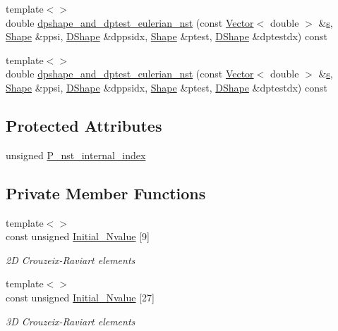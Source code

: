 \begin{DoxyCompactItemize}
\item 
{\footnotesize template$<$$>$ }\\double \hyperlink{classoomph_1_1GeneralisedNewtonianQCrouzeixRaviartElement_a832cb3cfcd2ea1ea15859cb656eaadc9}{dpshape\+\_\+and\+\_\+dptest\+\_\+eulerian\+\_\+nst} (const \hyperlink{classoomph_1_1Vector}{Vector}$<$ double $>$ \&\hyperlink{cfortran_8h_ab7123126e4885ef647dd9c6e3807a21c}{s}, \hyperlink{classoomph_1_1Shape}{Shape} \&ppsi, \hyperlink{classoomph_1_1DShape}{D\+Shape} \&dppsidx, \hyperlink{classoomph_1_1Shape}{Shape} \&ptest, \hyperlink{classoomph_1_1DShape}{D\+Shape} \&dptestdx) const
\item 
{\footnotesize template$<$$>$ }\\double \hyperlink{classoomph_1_1GeneralisedNewtonianQCrouzeixRaviartElement_a57837b3d35eda32c93e24d9de4a651a1}{dpshape\+\_\+and\+\_\+dptest\+\_\+eulerian\+\_\+nst} (const \hyperlink{classoomph_1_1Vector}{Vector}$<$ double $>$ \&\hyperlink{cfortran_8h_ab7123126e4885ef647dd9c6e3807a21c}{s}, \hyperlink{classoomph_1_1Shape}{Shape} \&ppsi, \hyperlink{classoomph_1_1DShape}{D\+Shape} \&dppsidx, \hyperlink{classoomph_1_1Shape}{Shape} \&ptest, \hyperlink{classoomph_1_1DShape}{D\+Shape} \&dptestdx) const
\end{DoxyCompactItemize}
\subsection*{Protected Attributes}
\begin{DoxyCompactItemize}
\item 
unsigned \hyperlink{classoomph_1_1GeneralisedNewtonianQCrouzeixRaviartElement_a2bc5b97ad560bd65dd2548f6d2d46a3b}{P\+\_\+nst\+\_\+internal\+\_\+index}
\end{DoxyCompactItemize}
\subsection*{Private Member Functions}
\begin{DoxyCompactItemize}
\item 
{\footnotesize template$<$$>$ }\\const unsigned \hyperlink{classoomph_1_1GeneralisedNewtonianQCrouzeixRaviartElement_aab82aa86c3395ff6ee60b16e23cfc225}{Initial\+\_\+\+Nvalue} \mbox{[}9\mbox{]}
\begin{DoxyCompactList}\small\item\em 2D Crouzeix-\/\+Raviart elements \end{DoxyCompactList}\item 
{\footnotesize template$<$$>$ }\\const unsigned \hyperlink{classoomph_1_1GeneralisedNewtonianQCrouzeixRaviartElement_aead6246b3b00feb261480ab0f9e56fca}{Initial\+\_\+\+Nvalue} \mbox{[}27\mbox{]}
\begin{DoxyCompactList}\small\item\em 3D Crouzeix-\/\+Raviart elements \end{DoxyCompactList}\end{DoxyCompactItemize}
